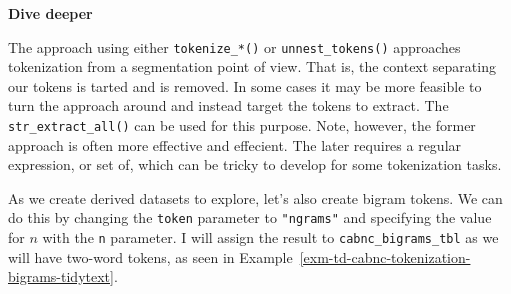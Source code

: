 \documentclass[
  letterpaper,
  DIV=11,
  numbers=noendperiod]{scrreport}
\theoremstyle{definition}
\theoremstyle{remark}
\begin{document}
\begin{tcolorbox}[enhanced jigsaw, leftrule=.75mm, bottomrule=.15mm, opacityback=0, breakable, left=2mm, colback=white, toprule=.15mm, arc=.35mm, rightrule=.15mm]

\textbf{ Dive deeper}

The approach using either \texttt{tokenize\_*()} or
\texttt{unnest\_tokens()} approaches tokenization from a segmentation
point of view. That is, the context separating our tokens is tarted and
is removed. In some cases it may be more feasible to turn the approach
around and instead target the tokens to extract. The
\texttt{str\_extract\_all()} can be used for this purpose. Note,
however, the former approach is often more effective and effecient. The
later requires a regular expression, or set of, which can be tricky to
develop for some tokenization tasks.

\end{tcolorbox}

As we create derived datasets to explore, let's also create bigram
tokens. We can do this by changing the \texttt{token} parameter to
\texttt{"ngrams"} and specifying the value for \(n\) with the \texttt{n}
parameter. I will assign the result to \texttt{cabnc\_bigrams\_tbl} as
we will have two-word tokens, as seen in
Example~\ref{exm-td-cabnc-tokenization-bigrams-tidytext}.
\end{document}
